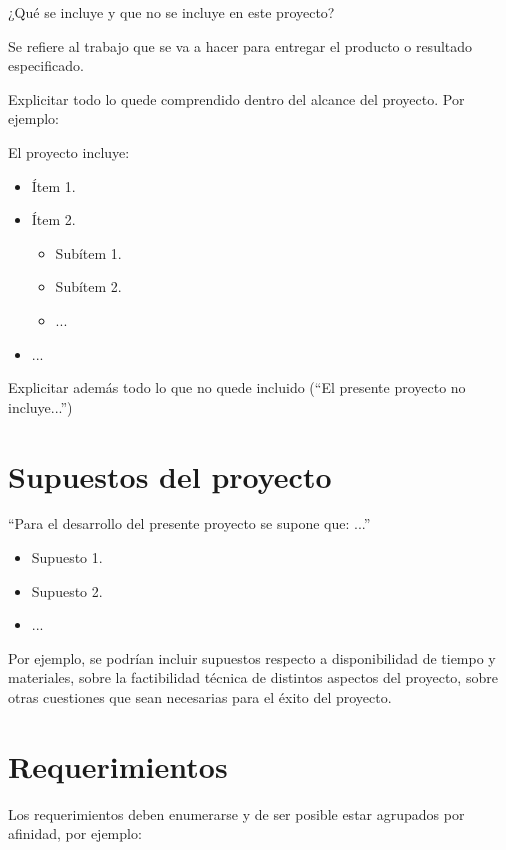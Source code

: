 \documentclass[12pt]{catolica_proyectos}
\begin{document}
	¿Qué se incluye y que no se incluye en este proyecto?
	
	Se refiere al trabajo que se va a hacer para entregar el producto o resultado especificado. 
	
	Explicitar todo lo quede comprendido dentro del alcance del proyecto. Por ejemplo:
	
	El proyecto incluye:
	\begin{itemize}
		\item Ítem 1.
		\item Ítem 2.
		\begin{itemize}
			\item Subítem 1.
			\item Subítem 2.
			\item ...
		\end{itemize}
		\item ...
		
	\end{itemize}
	
	Explicitar además todo lo que no quede incluido (``El presente proyecto no incluye...'')
	
	\section{Supuestos del proyecto}
	
	``Para el desarrollo del presente proyecto se supone que: ...''
	
	\begin{itemize}
		\item Supuesto 1.
		\item Supuesto 2.
		\item ...
	\end{itemize}
	
	Por ejemplo, se podrían incluir supuestos respecto a disponibilidad de tiempo y materiales, sobre la factibilidad técnica de distintos aspectos del proyecto, sobre otras cuestiones que sean necesarias para el éxito del proyecto.
	
	
	\section{Requerimientos}
	
	Los requerimientos deben enumerarse y de ser posible estar agrupados por afinidad, por ejemplo:
	
\end{document}
